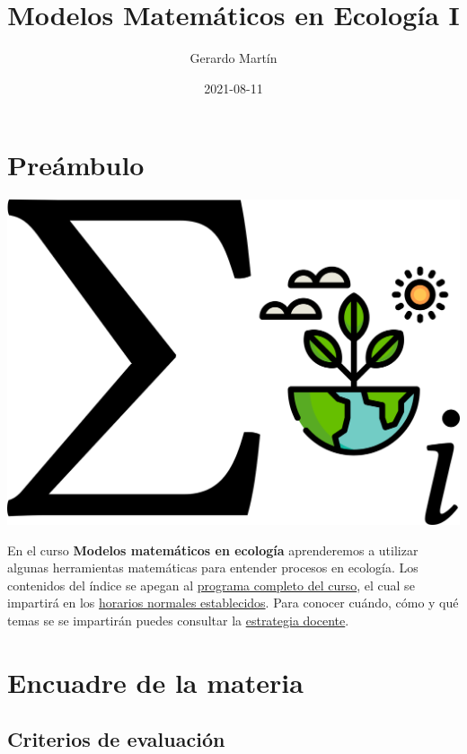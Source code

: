 \documentclass[
]{book}
\title{Modelos Matemáticos en Ecología I}
\author{Gerardo Martín}
\date{2021-08-11}
\begin{document}
\maketitle

{
\setcounter{tocdepth}{1}
\tableofcontents
}
\hypertarget{preuxe1mbulo}{%
\chapter{Preámbulo}\label{preuxe1mbulo}}

\begin{center}\includegraphics[width=20.83in]{logo} \end{center}

En el curso \textbf{Modelos matemáticos en ecología} aprenderemos a utilizar algunas herramientas matemáticas para entender procesos en ecología. Los contenidos del índice se apegan al \href{Programa-curso.pdf}{programa completo del curso}, el cual se impartirá en los \href{Horario.pdf}{horarios normales establecidos}. Para conocer cuándo, cómo y qué temas se se impartirán puedes consultar la \href{Estrategia-docente.pdf}{estrategia docente}.

\hypertarget{encuadre-de-la-materia}{%
\chapter{Encuadre de la materia}\label{encuadre-de-la-materia}}

\hypertarget{criterios-de-evaluaciuxf3n}{%
\section{Criterios de evaluación}\label{criterios-de-evaluaciuxf3n}}
\end{document}
